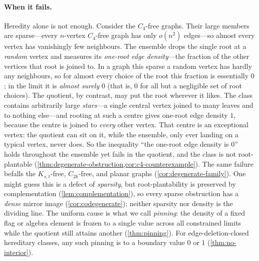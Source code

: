\documentclass[11pt]{article}
\theoremstyle{definition}
\begin{document}
\paragraph{When it fails.}
Heredity alone is not enough.  Consider the $C_4$-free graphs.  Their large members are
sparse---every $n$-vertex $C_4$-free graph has only $o(n^2)$ edges---so almost every vertex
has vanishingly few neighbours.  The ensemble drops the single root at a \emph{random}
vertex and measures its \emph{one-root edge density}---the fraction of the other vertices
that root is joined to.  In a graph this sparse a random vertex has hardly any neighbours,
so for almost every choice of the root this fraction is essentially $0$; in the limit it
is \emph{almost surely} $0$ (that is, $0$ for all but a negligible set of root choices).
The quotient, by contrast, may put the root wherever it likes.  The class contains
arbitrarily large \emph{stars}---a single central vertex joined to many leaves and to
nothing else---and rooting at such a centre gives one-root edge density $1$, because the
centre is joined to \emph{every} other vertex.  That centre is an exceptional vertex: the
quotient can sit on it, while the ensemble, only ever landing on a typical vertex, never
does.  So the inequality ``the one-root edge density is $0$'' holds throughout the ensemble
yet fails in the quotient, and the class is not root-plantable
(\cref{thm:degenerate-obstruction,cor:c4-counterexample}).  The same failure befalls the
$K_{s,t}$-free, $C_{2k}$-free, and planar graphs (\cref{cor:degenerate-family}).  One
might guess this is a defect of \emph{sparsity}, but root-plantability is preserved by
complementation (\cref{lem:complementation}), so every sparse obstruction has a
\emph{dense} mirror image (\cref{cor:codegenerate}); neither sparsity nor density is the
dividing line.  The uniform cause is what we call \emph{pinning}: the density of
a fixed flag or algebra element is frozen to a single value across all constrained
limits while the quotient still attains another (\cref{thm:pinning}).  For
edge-deletion-closed hereditary classes, any such pinning is to a boundary value $0$ or $1$
(\cref{thm:no-interior}).
\end{document}
